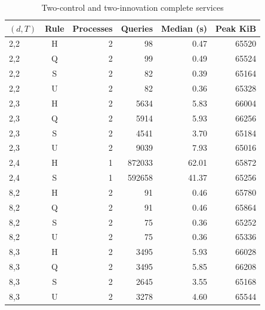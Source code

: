 \begin{table}[htbp]
\centering\caption{Two-control and two-innovation complete services}\label{tab:vector70}
{\small\setlength{\tabcolsep}{3pt}
\begin{tabular}{lcrrrr}
\hline
$(d,T)$ & Rule & Processes & Queries & Median (s) & Peak KiB \\
\hline
2,2 & H & 2 & 98 & 0.47 & 65520 \\
2,2 & Q & 2 & 99 & 0.49 & 65524 \\
2,2 & S & 2 & 82 & 0.39 & 65164 \\
2,2 & U & 2 & 82 & 0.36 & 65328 \\
2,3 & H & 2 & 5634 & 5.83 & 66004 \\
2,3 & Q & 2 & 5914 & 5.93 & 66256 \\
2,3 & S & 2 & 4541 & 3.70 & 65184 \\
2,3 & U & 2 & 9039 & 7.93 & 65016 \\
2,4 & H & 1 & 872033 & 62.01 & 65872 \\
2,4 & S & 1 & 592658 & 41.37 & 65256 \\
8,2 & H & 2 & 91 & 0.46 & 65780 \\
8,2 & Q & 2 & 91 & 0.46 & 65864 \\
8,2 & S & 2 & 75 & 0.36 & 65252 \\
8,2 & U & 2 & 75 & 0.36 & 65336 \\
8,3 & H & 2 & 3495 & 5.93 & 66028 \\
8,3 & Q & 2 & 3495 & 5.85 & 66208 \\
8,3 & S & 2 & 2645 & 3.55 & 65168 \\
8,3 & U & 2 & 3278 & 4.60 & 65544 \\
\hline\end{tabular}}
\par{}
\end{table}
